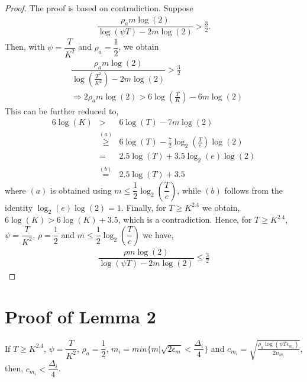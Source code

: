 \begin{proof}
The proof is based on contradiction. Suppose
\begin{eqnarray*}
\dfrac{\rho_a m \log(2)}{\log(\psi T) - 2m\log( 2)} > \frac{3}{2}.
\end{eqnarray*}
Then, with $\psi=\dfrac{T}{ K^2}$ and $\rho_a =\dfrac{1}{2}$, we obtain
\begin{align*}
&\dfrac{\rho_a m \log(2)}{\log(\frac{T^2}{K^2}) - 2m\log( 2)} > \frac{3}{2}\\
&\Rightarrow 2\rho_a m \log(2) > 6\log(\frac{T}{K}) - 6m\log( 2)
\end{align*}
This can be further reduced to,
\begin{eqnarray*}
6\log(K) 
&>& 6\log(T) - 7m\log(2) \\
&\overset{(a)}{\ge}& 6\log(T) - \frac{7}{2} \log_2\left(\frac{T}{e}\right) \log(2) \\
&=& 2.5\log(T) + 3.5 \log_2(e)\log(2)  \\
&\overset{(b)}{=}& 2.5\log(T) +3.5
\end{eqnarray*}
where $(a)$ is obtained using $m\leq \dfrac{1}{2} \log_2\left(\dfrac{T}{e}\right)$, while $(b)$ follows from the identity $\log_2(e)\log(2) =1$. Finally, for $T\ge K^{2.4}$ we obtain, $6\log(K)>6\log(K)+3.5$, which is a contradiction. Hence, for $T\geq K^{2.4}$, $\psi=\dfrac{T}{ K^2}$, $\rho=\dfrac{1}{2}$ and $m \leq \dfrac{1}{2} \log_2\left(\dfrac{T}{e}\right) $ we have, 
\begin{align*}
\dfrac{\rho m \log(2)}{\log(\psi T) - 2m\log( 2)} \leq \frac{3}{2}
\end{align*}
\end{proof}

\section{Proof of Lemma 2}
\label{App:Lemma2}
\begin{lemma}
\label{proofTheorem:Lemma:2}
If $T\geq K^{2.4}$, $\psi=\dfrac{T}{ K^2}$, $\rho_a =\dfrac{1}{2}$, $m_i = min\lbrace m|\sqrt{2\epsilon_{m} } < \dfrac{\Delta_i}{4} \rbrace $ and $c_{m_i} =\sqrt{\frac{\rho_{a}\log (\psi T\epsilon_{m_{i}})}{2 n_{m_i}}}$, then, $c_{m_i} < \dfrac{\Delta_i}{4}$.
\end{lemma}

